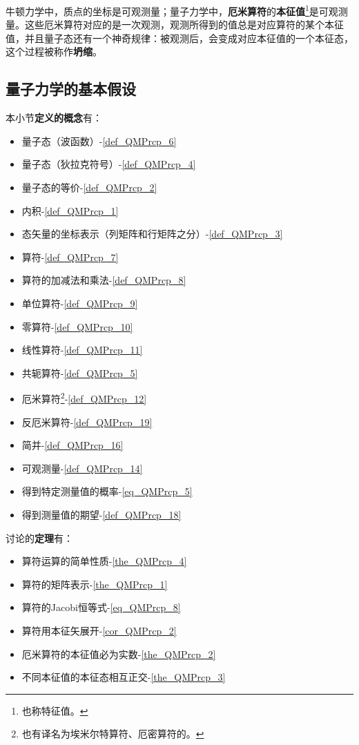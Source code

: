 牛顿力学中，质点的坐标是可观测量；量子力学中，\textbf{厄米算符}的\textbf{本征值}\footnote{也称特征值。}是可观测量。这些厄米算符对应的是一次观测，观测所得到的值总是对应算符的某个本征值，并且量子态还有一个神奇规律：被观测后，会变成对应本征值的一个本征态，这个过程被称作\textbf{坍缩}。



\subsection{量子力学的基本假设}\label{sub_QMPrcp_2}

本小节\textbf{定义的概念}有：

\begin{itemize}
\item 量子态（波函数）-\autoref{def_QMPrcp_6} 
\item 量子态（狄拉克符号）-\autoref{def_QMPrcp_4} 
\item 量子态的等价-\autoref{def_QMPrcp_2} 
\item 内积-\autoref{def_QMPrcp_1} 
\item 态矢量的坐标表示（列矩阵和行矩阵之分）-\autoref{def_QMPrcp_3} 
\item 算符-\autoref{def_QMPrcp_7} 
\item 算符的加减法和乘法-\autoref{def_QMPrcp_8} 
\item 单位算符-\autoref{def_QMPrcp_9} 
\item 零算符-\autoref{def_QMPrcp_10} 
\item 线性算符-\autoref{def_QMPrcp_11} 
\item 共轭算符-\autoref{def_QMPrcp_5} 
\item 厄米算符\footnote{也有译名为埃米尔特算符、厄密算符的。}-\autoref{def_QMPrcp_12} 
\item 反厄米算符-\autoref{def_QMPrcp_19} 
\item 简并-\autoref{def_QMPrcp_16} 
\item 可观测量-\autoref{def_QMPrcp_14} 
\item 得到特定测量值的概率-\autoref{eq_QMPrcp_5} 
\item 得到测量值的期望-\autoref{def_QMPrcp_18} 
\end{itemize}


讨论的\textbf{定理}有：

\begin{itemize}
\item 算符运算的简单性质-\autoref{the_QMPrcp_4} 
\item 算符的矩阵表示-\autoref{the_QMPrcp_1} 
\item 算符的Jacobi恒等式-\autoref{eq_QMPrcp_8} 
\item 算符用本征矢展开-\autoref{cor_QMPrcp_2} 
\item 厄米算符的本征值必为实数-\autoref{the_QMPrcp_2} 
\item 不同本征值的本征态相互正交-\autoref{the_QMPrcp_3} 
\end{itemize}




